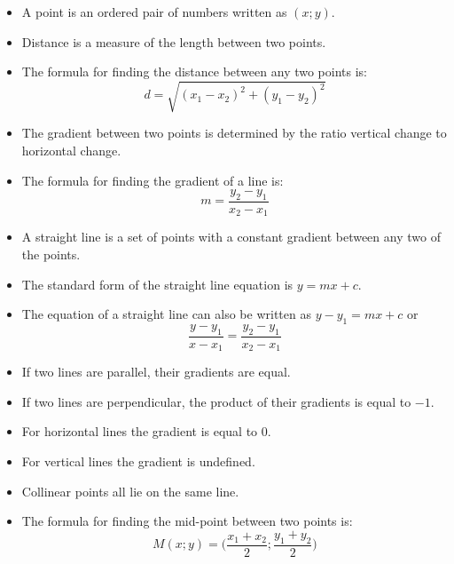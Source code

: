 \summary
\begin{itemize}[noitemsep]
\item A point is an ordered pair of numbers written as $(x;y)$.
\item Distance is a measure of the length between two points.
\item The formula for finding the distance between  any two points is: 
\begin{equation*}
d=\sqrt{{({x}_{1}-{x}_{2})}^{2}+{({y}_{1}-{y}_{2})}^{2}}
\end{equation*}
\item The gradient between two points is determined by the ratio vertical change to horizontal change.

\item The formula for finding the gradient of a line is: 
\begin{equation*}
m=\frac{{y}_{2}-{y}_{1}}{{x}_{2}-{x}_{1}}
\end{equation*}
\item A straight line is a set of points with a constant gradient between any two of the
points.
\item The standard form of the straight line equation is $y=mx+c$.
\item The equation of a straight line can also be written as $y-y_1=mx+c$  or 
\begin{equation*}
\dfrac{y-y_1}{x-x_1}=\dfrac{y_2-y_1}{x_2-x_1}\end{equation*}
\item If two lines are parallel, their gradients are equal.
\item If two lines are perpendicular, the product of their gradients is equal to $-1$.
\item For horizontal lines the gradient is equal to $0$.
\item For vertical lines the gradient is undefined.
\item Collinear points all lie on the same line.
\item The formula for finding the mid-point between two points is: 
\begin{equation*}
M(x;y) = \Big(\frac{{x}_{1}+{x}_{2}}{2};\frac{{y}_{1}+{y}_{2}}{2}\Big)
\end{equation*}
\end{itemize}


